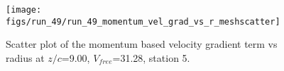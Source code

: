 \begin{figure}[H]
\centering
\texttt{[image: figs/run\_49/run\_49\_momentum\_vel\_grad\_vs\_r\_meshscatter]}
\caption{Scatter plot of the momentum based velocity gradient term vs radius at $z/c$=9.00, $V_{free}$=31.28, station 5.}
\label{fig:run_49_momentum_vel_grad_vs_r_meshscatter}
\end{figure}


